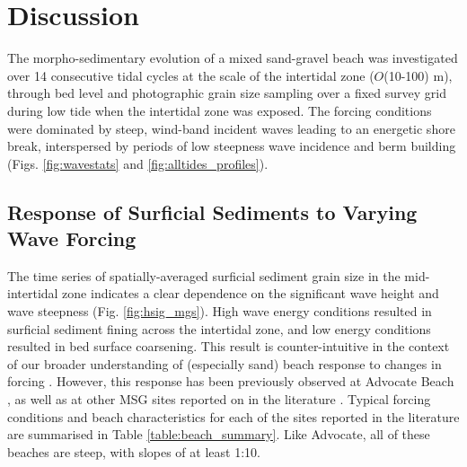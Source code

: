 \section{Discussion}\label{section:ch3_discussion}


The morpho-sedimentary evolution of a mixed sand-gravel beach was investigated over 14 consecutive tidal cycles at the scale of the intertidal zone ($O$(10-100) m), through bed level and photographic grain size sampling over a fixed survey grid during low tide when the intertidal zone was exposed. The forcing conditions were dominated by steep, wind-band incident waves leading to an energetic shore break, interspersed by periods of low steepness wave incidence and berm building (Figs. \ref{fig:wavestats} and \ref{fig:alltides_profiles}). 

\subsection{Response of Surficial Sediments to Varying Wave Forcing}

The time series of spatially-averaged surficial sediment grain size in the mid-intertidal zone indicates a clear dependence on the significant wave height and wave steepness (Fig. \ref{fig:hsig_mgs}). High wave energy conditions resulted in surficial sediment fining across the intertidal zone, and low energy conditions resulted in bed surface coarsening. This result is counter-intuitive in the context of our broader understanding of (especially sand) beach response to changes in forcing \citep[e.g.,][]{Bascom1951, Masselink_etal2007}. However, this response has been previously observed at Advocate Beach \citep{Hay_etal2014}, as well as at other MSG sites reported on in the literature \citep{Nordstrom_Jackson1993, Pontee_etal2004, Curtiss_etal2009, Miller_etal2011}. Typical forcing conditions and beach characteristics for each of the sites reported in the literature are summarised in Table \ref{table:beach_summary}. Like Advocate, all of these beaches are steep, with slopes of at least 1:10.

